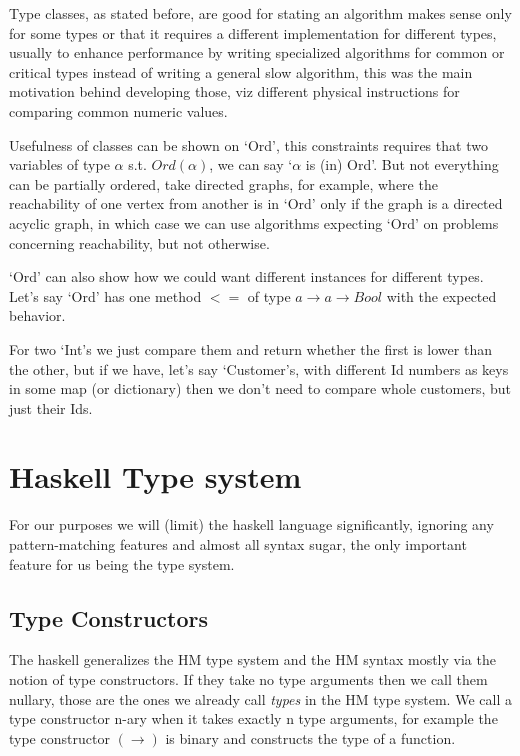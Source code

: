 Type classes, as stated before, are good for stating an algorithm makes sense only for some types or that it requires a different implementation for different types, usually to enhance performance by writing specialized algorithms for common or critical types instead of writing a general slow algorithm, this was the main motivation behind developing those, %
viz different physical instructions for comparing common numeric values.

Usefulness of classes can be shown on `Ord', this constraints requires that two variables of type $\alpha$ s.t. $Ord(\alpha)$, we can say `$\alpha$ is (in) Ord'. But not everything can be partially ordered, take directed graphs, for example, where the reachability of one vertex from another is in `Ord' only if the graph is a directed acyclic graph, in which case we can use algorithms expecting `Ord' on problems concerning reachability, but not otherwise.

`Ord' can also show how we could want different instances for different types. Let's say `Ord' has one method $<=$ of type $a \rightarrow a \rightarrow Bool$ with the expected behavior. %

For two `Int's we just compare them and return whether the first is lower than the other, but if we have, let's say `Customer's, with different Id numbers as keys in some map (or dictionary) then we don't need to compare whole customers, but just their Ids.

\section{Haskell Type system}

For our purposes we will (limit) the haskell language significantly, ignoring any pattern-matching features and almost all syntax sugar, the only important feature for us being the type system. %

\subsection{Type Constructors}

The haskell generalizes the HM type system and the HM syntax mostly via the notion of type constructors. If they take no type arguments then we call them nullary, those are the ones we already call \emph{types} in the HM type system. We call a type constructor n-ary when it takes exactly n type arguments, for example the type constructor $(\rightarrow)$ is binary and constructs the type of a function. %


